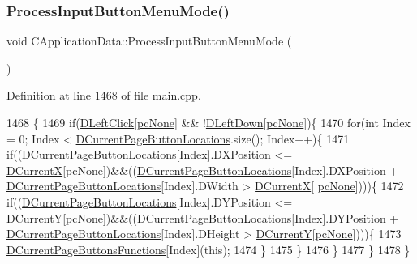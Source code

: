 \subsubsection{\texorpdfstring{Process\+Input\+Button\+Menu\+Mode()}{ProcessInputButtonMenuMode()}}
{\footnotesize\ttfamily void C\+Application\+Data\+::\+Process\+Input\+Button\+Menu\+Mode (\begin{DoxyParamCaption}{ }\end{DoxyParamCaption})\hspace{0.3cm}{\ttfamily [protected]}}



Definition at line 1468 of file main.\+cpp.


\begin{DoxyCode}
1468                                                  \{
1469     \textcolor{keywordflow}{if}(\hyperlink{classCApplicationData_a8a86bb4c7cba7b119121401dda4ca68b}{DLeftClick}[\hyperlink{GameDataTypes_8h_aafb0ca75933357ff28a6d7efbdd7602fa88767aa8e02c7b3192bbab4127b3d729}{pcNone}] && !\hyperlink{classCApplicationData_a2b943f18557c3e4c8cd4550e22e028b6}{DLeftDown}[\hyperlink{GameDataTypes_8h_aafb0ca75933357ff28a6d7efbdd7602fa88767aa8e02c7b3192bbab4127b3d729}{pcNone}])\{
1470         \textcolor{keywordflow}{for}(\textcolor{keywordtype}{int} Index = 0; Index < \hyperlink{classCApplicationData_a3615df8e23cea3ce17f11cf61340a7b4}{DCurrentPageButtonLocations}.size(); Index++)\{
1471             \textcolor{keywordflow}{if}((\hyperlink{classCApplicationData_a3615df8e23cea3ce17f11cf61340a7b4}{DCurrentPageButtonLocations}[Index].DXPosition <= 
      \hyperlink{classCApplicationData_a1dc7ee482a39f7978c71365ac540f97a}{DCurrentX}[pcNone])&&((\hyperlink{classCApplicationData_a3615df8e23cea3ce17f11cf61340a7b4}{DCurrentPageButtonLocations}[Index].DXPosition + 
      \hyperlink{classCApplicationData_a3615df8e23cea3ce17f11cf61340a7b4}{DCurrentPageButtonLocations}[Index].DWidth > \hyperlink{classCApplicationData_a1dc7ee482a39f7978c71365ac540f97a}{DCurrentX}[
      \hyperlink{GameDataTypes_8h_aafb0ca75933357ff28a6d7efbdd7602fa88767aa8e02c7b3192bbab4127b3d729}{pcNone}])))\{
1472                 \textcolor{keywordflow}{if}((\hyperlink{classCApplicationData_a3615df8e23cea3ce17f11cf61340a7b4}{DCurrentPageButtonLocations}[Index].DYPosition <= 
      \hyperlink{classCApplicationData_a0ba39779ae11c8072258c6ddfebd6052}{DCurrentY}[pcNone])&&((\hyperlink{classCApplicationData_a3615df8e23cea3ce17f11cf61340a7b4}{DCurrentPageButtonLocations}[Index].DYPosition + 
      \hyperlink{classCApplicationData_a3615df8e23cea3ce17f11cf61340a7b4}{DCurrentPageButtonLocations}[Index].DHeight > 
      \hyperlink{classCApplicationData_a0ba39779ae11c8072258c6ddfebd6052}{DCurrentY}[\hyperlink{GameDataTypes_8h_aafb0ca75933357ff28a6d7efbdd7602fa88767aa8e02c7b3192bbab4127b3d729}{pcNone}])))\{
1473                     \hyperlink{classCApplicationData_ad3079e5563a19d21c1e4ceff2a188382}{DCurrentPageButtonsFunctions}[Index](\textcolor{keyword}{this});
1474                 \}
1475             \}
1476         \}
1477     \}   
1478 \}
\end{DoxyCode}

